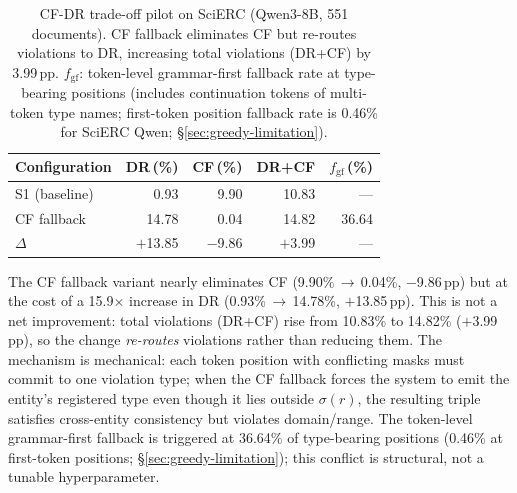 \begin{table}[t]
\centering
\small
\begin{tabular}{@{}l rrrr@{}}
\toprule
\textbf{Configuration} & \textbf{DR\,(\%)} & \textbf{CF\,(\%)} & \textbf{DR+CF} & \textbf{$f_{\text{gf}}$\,(\%)} \\
\midrule
S1 (baseline) & 0.93 & 9.90 & 10.83 & --- \\
CF fallback        & 14.78 & 0.04 & 14.82 & 36.64 \\
\midrule
$\Delta$ & $+$13.85 & $-$9.86 & $+$3.99 & --- \\
\bottomrule
\end{tabular}
\caption{CF-DR trade-off pilot on SciERC (Qwen3-8B, 551 documents). CF fallback eliminates CF but re-routes violations to DR, increasing total violations (DR+CF) by 3.99\,pp. $f_{\text{gf}}$: token-level grammar-first fallback rate at type-bearing positions (includes continuation tokens of multi-token type names; first-token position fallback rate is 0.46\% for SciERC Qwen; \S\ref{sec:greedy-limitation}).}
\label{tab:cf-dr-tradeoff}
\end{table}

The CF fallback variant nearly eliminates CF (9.90\%\,$\to$\,0.04\%, $-$9.86\,pp) but at the cost of a 15.9$\times$ increase in DR (0.93\%\,$\to$\,14.78\%, $+$13.85\,pp).
This is not a net improvement: total violations (DR+CF) rise from 10.83\% to 14.82\% ($+$3.99\,pp), so the change \emph{re-routes} violations rather than reducing them.
The mechanism is mechanical: each token position with conflicting masks must commit to one violation type; when the CF fallback forces the system to emit the entity's registered type even though it lies outside $\sigma(r)$, the resulting triple satisfies cross-entity consistency but violates domain/range.
The token-level grammar-first fallback is triggered at 36.64\% of type-bearing positions (0.46\% at first-token positions; \S\ref{sec:greedy-limitation}); this conflict is structural, not a tunable hyperparameter.

